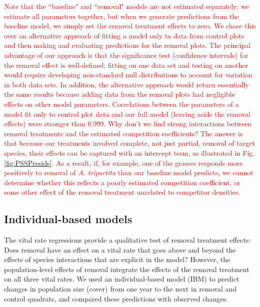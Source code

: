 \documentclass[11pt]{article}
\newcommand{\new}{\textcolor{red}}
\begin{document}
\begin{doublespacing}
\new{Note that the ``baseline" and ``removal" models are not estimated separately; we estimate all parameters together, but when we generate predictions from the baseline model, 
we simply set the removal treatment effects to zero. We chose this over an alternative approach of fitting a model only to data from control plots and then making 
and evaluating predictions for the removal plots. The principal advantage of our approach is that the significance test (confidence intervals) for the removal effect 
is well-defined; fitting on one data set and testing on another would require developing non-standard null distributions to account for variation in both data sets. In addition, the alternative approach would return 
essentially the same results because adding data from the removal plots had negligible effects on other model parameters. Correlations between the parameters of 
a model fit only to control plot data and our full model (leaving aside the removal effects) were stronger than 0.999. 
Why don't we find strong interactions between removal treatments and the estimated competition coefficients? The answer is that because our treatments 
involved complete, not just partial, removal of target species, their effects can be captured with an intercept term, as illustrated in Fig. \ref{fig:PSSPresids}. 
As a result, if, for example, one of the grasses responds more positively to removal of \textit{A. tripartita} than our baseline model predicts, we cannot 
determine whether this reflects a poorly estimated competition coefficient, or some other effect of the removal treatment unrelated to competitor densities.}

\subsection*{Individual-based models}
The vital rate regressions provide a qualitative test of removal treatment effects: Does removal have an effect on a vital rate that goes above and beyond the effects of species interactions that are explicit in the model? However, the population-level effects of removal integrate the effects of the removal treatment on all three vital rates. We used an individual-based model (IBM) to predict changes in population size (cover) from one year to the next in removal and control quadrats, and compared these predictions with observed changes. 


\end{doublespacing}
\end{document}
